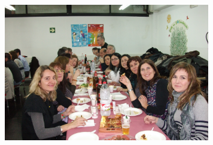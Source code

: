 \begin{news}
\noindent\includegraphics[width=9cm,keepaspectratio]{ampa/img/DSCF0920.JPG}


\end{news}
